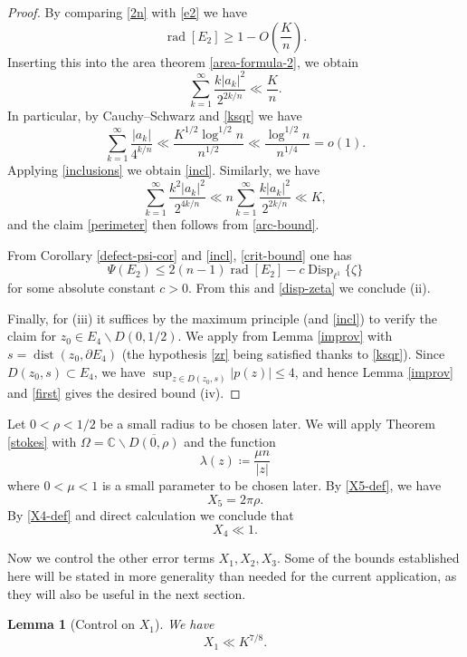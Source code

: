 \documentclass[12pt]{amsart}
\newtheorem{lemma}{Lemma}[section]
\newcommand{\C}{\mathbb{C}}
\renewcommand{\r}{\operatorname{rad}}
\newcommand{\dist}{\operatorname{dist}}
\newcommand{\Disp}{\operatorname{Disp}_{\ell^1}}
\begin{document}
\begin{proof}
By comparing \eqref{2n} with \eqref{e2} we have
$$ \r[E_2] \geq 1 - O\left(\frac{K}{n}\right).$$
Inserting this into the area theorem \eqref{area-formula-2}, we obtain
$$ \sum_{k=1}^\infty \frac{k |a_k|^2}{2^{2k/n}} \ll \frac{K}{n}.
$$
In particular, by Cauchy--Schwarz and \eqref{ksqr} we have
$$ \sum_{k=1}^\infty \frac{|a_k|}{4^{k/n}} \ll \frac{K^{1/2} \log^{1/2} n}{n^{1/2}} \ll \frac{\log^{1/2} n}{n^{1/4}} = o(1).$$
Applying \eqref{inclusions} we obtain \eqref{incl}.  Similarly, we have
$$ \sum_{k=1}^\infty \frac{k^2 |a_k|^2}{2^{4k/n}}  \ll n  \sum_{k=1}^\infty \frac{k |a_k|^2}{2^{2k/n}} \ll K,$$
and the claim \eqref{perimeter} then follows from \eqref{arc-bound}.

From Corollary \ref{defect-psi-cor} and \eqref{incl}, \eqref{crit-bound} one has
$$\Psi(E_2) \leq 2(n-1) \r[E_2] - c \Disp \{\zeta\}$$
for some absolute constant $c>0$.  From this and \eqref{disp-zeta} we conclude (ii).

Finally, for (iii) it suffices by the maximum principle (and \eqref{incl}) to verify the claim for $z_0 \in E_4 \backslash D(0,1/2)$. We apply from Lemma \ref{improv} with $s = \dist(z_0, \partial E_4)$ (the hypothesis \eqref{zr} being satisfied thanks to \eqref{ksqr}).  Since $D(z_0,s) \subset E_4$, we have $\sup_{z \in D(z_0,s)} |p(z)| \leq 4$, and hence Lemma \ref{improv} and \eqref{first} gives the desired bound (iv).
\end{proof}

Let $0 < \rho < 1/2$ be a small radius to be chosen later.
We will apply Theorem \ref{stokes} with $\Omega=\C \backslash \overline{D(0,\rho)}$ and the function
$$ \lambda(z) \coloneqq \frac{\mu n}{|z|}$$
where $0 < \mu < 1$ is a small parameter to be chosen later.  By \eqref{X5-def}, we have
\begin{equation}\label{x5}
    X_5 = 2\pi \rho.
\end{equation}
 By \eqref{X4-def} and direct calculation we conclude that
\begin{equation}\label{x4}
 X_4 \ll 1.
\end{equation}

Now we control the other error terms $X_1,X_2,X_3$.  Some of the bounds established here will be stated in more generality than needed for the current application, as they will also be useful in the next section.

\begin{lemma}[Control on $X_1$]  We have
    $$ X_1 \ll K^{7/8}.$$
\end{lemma}
\end{document}
